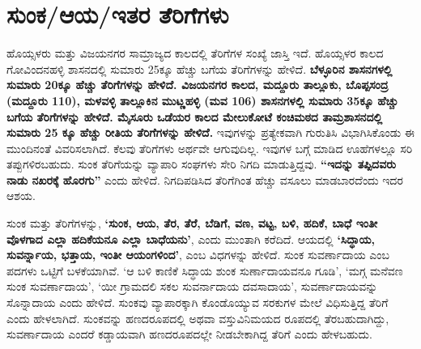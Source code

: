\newpage

\section{ಸುಂಕ/ಆಯ/ಇತರ ತೆರಿಗೆಗಳು}

ಹೊಯ್ಸಳರು ಮತ್ತು ವಿಜಯನಗರ ಸಾಮ್ರಾಜ್ಯದ ಕಾಲದಲ್ಲಿ ತೆರಿಗೆಗಳ ಸಂಖ್ಯೆ ಜಾಸ್ತಿ ಇದೆ. ಹೊಯ್ಸಳರ ಕಾಲದ ಗೋವಿಂದನಹಳ್ಳಿ ಶಾಸನದಲ್ಲಿ ಸುಮಾರು 25ಕ್ಕೂ ಹೆಚ್ಚು ಬಗೆಯ ತೆರಿಗೆಗಳನ್ನು ಹೇಳಿದೆ. \textbf{ಬೆಳ್ಳೂರಿನ ಶಾಸನಗಳಲ್ಲಿ ಸುಮಾರು 20ಕ್ಕೂ ಹೆಚ್ಚು ತೆರಿಗೆಗಳನ್ನು ಹೇಳಿದೆ. ವಿಜಯನಗರ ಕಾಲದ, ಮದ್ದೂರು ತಾಲ್ಲೂಕು, ಬೊಪ್ಪಸಂದ್ರ (ಮದ್ದೂರು 110), ಮಳವಳ್ಳಿ ತಾಲ್ಲೂಕಿನ ಮುಟ್ಣಹಳ್ಳಿ (ಮವ 106) ಶಾಸನಗಳಲ್ಲಿ ಸುಮಾರು 35ಕ್ಕೂ ಹೆಚ್ಚು ಬಗೆಯ ತೆರಿಗೆಗಳನ್ನು ಹೇಳಿದೆ. ಮೈಸೂರು ಒಡೆಯರ ಕಾಲದ ಮೇಲುಕೋಟೆ ಕಂಚಿಮಠದ ತಾಮ್ರಶಾಸನದಲ್ಲಿ ಸುಮಾರು 25 ಕ್ಕೂ ಹೆಚ್ಚು ರೀತಿಯ ತೆರಿಗೆಗಳನ್ನು ಹೇಳಿದೆ.} ಇವುಗಳನ್ನು ಪ್ರತ್ಯೇಕವಾಗಿ ಗುರುತಿಸಿ ವಿಭಾಗಿಸಿಕೊಂಡು ಈ ಮುಂದಿನಂತೆ ವಿವರಿಸಲಾಗಿದೆ. ಕೆಲವು ತೆರಿಗೆಗಳು ಅರ್ಥವೇ ಆಗುವುದಿಲ್ಲ. ಇವುಗಳ ಬಗ್ಗೆ ಮಾಡಿದ ಊಹೆಗಳಲ್ಲೂ ಸರಿ ತಪ್ಪುಗಳಿರಬಹುದು. ಸುಂಕ ತೆರಿಗೆಯನ್ನು ವ್ಯಾಪಾರಿ ಸಂಘಗಳು ಸೇರಿ ನಿಗದಿ ಮಾಡುತ್ತಿದ್ದವು. \textbf{“ಇದನ್ನು ತಪ್ಪಿದವರು ನಾಡು ನಖರಕ್ಕೆ ಹೊರಗು”} ಎಂದು ಹೇಳಿದೆ. ನಿಗದಿಪಡಿಸಿದ ತೆರಿಗೆಗಿಂತ ಹೆಚ್ಚು ವಸೂಲು ಮಾಡಬಾರದೆಂದು ಇದರ ಆಶಯ.

ಸುಂಕ ಮತ್ತು ತೆರಿಗೆಗಳನ್ನು, \textbf{‘ಸುಂಕ, ಆಯ, ತೆರ, ತೆರೆ, ಬೆಡಿಗೆ, ವಣ, ವಟ್ಟ, ಬಳಿ, ಹದಿಕೆ, ಬಾಧೆ ಇಂತೀ ವೊಳಗಾದ ಎಲ್ಲಾ ಹದಿಕೆಯನೂ ಎಲ್ಲಾ ಬಾಧೆಯನು’}, ಎಂದು ಮುಂತಾಗಿ ಕರೆದಿದೆ. ಆಯದಲ್ಲಿ \textbf{‘ಸಿದ್ಧಾಯ, ಸುವರ್ನ್ನಾಯ, ಭತ್ತಾಯ, ಇಂತೀ ಆಯಂಗಳಿಂದ’}, ಎಂಬ ವಿಧಗಳನ್ನು ಹೇಳಿದೆ. ಸುಂಕ ಸುವರ್ಣಾದಾಯ ಎಂಬ ಪದಗಳು ಒಟ್ಟಿಗೆ ಬಳಕೆಯಾಗಿವೆ. ‘ಆ ಬಳಿ ಕಾಣಿಕೆ ಸಿದ್ಧಾಯ ಶುಂಕ ಸುರ್ಣಾದಾಯವನೂ ಗೂಡಿ’, ‘ಮಗ್ಗ ಮನೆವಣ ಸುಂಕ ಸುವರ್ಣಾದಾಯ’, ‘ಯೀ ಗ್ರಾಮದಲಿ ಸಕಲ ಸುವರ್ನಾದಾಯ ದವಸಾದಾಯ’, ಸುವರ್ಣಾದಾಯವನ್ನು ಸೊನ್ನಾದಾಯ ಎಂದು ಹೇಳಿದೆ. ಸುಂಕವು ವ್ಯಾಪಾರಕ್ಕಾಗಿ ಕೊಂಡೊಯ್ಯುವ ಸರಕುಗಳ ಮೇಲೆ ವಿಧಿಸುತ್ತಿದ್ದ ತೆರಿಗೆ ಎಂದು ಹೇಳಲಾಗಿದೆ. ಸುಂಕವನ್ನು ಹಣದರೂಪದಲ್ಲಿ ಅಥವಾ ವಸ್ತುವಿನಿಮಯದ ರೂಪದಲ್ಲಿ ತೆರಬಹುದಾಗಿದ್ದು, ಸುವರ್ಣಾದಾಯ ಎಂದರೆ ಕಡ್ಡಾಯವಾಗಿ ಹಣದರೂಪದಲ್ಲೇ ನೀಡಬೇಕಾಗಿದ್ದ ತೆರಿಗೆ ಎಂದು ಹೇಳಬಹುದು.

